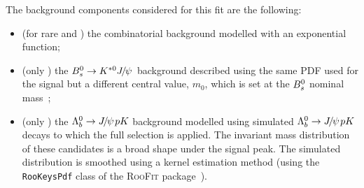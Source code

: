 The background components considered for this fit are the following:
\begin{itemize}
\item (for rare and \jpsi) the combinatorial background modelled with an exponential function;
\item (only \jpsi) the $\Bs\to\Kstarz\jpsi$ background described using the same PDF used for the signal but a different
central value, $m_{0}$, which is set at the ${{B}^0_{s}}$ nominal mass~\cite{PDG2014};
\item (only \jpsi) the $\Lb\to\jpsi pK$ background modelled using simulated \mbox{$\Lb\to\jpsi pK$} decays
to which the full selection is applied. The invariant mass distribution
of these candidates is a broad shape under the signal peak. The simulated distribution 
is smoothed using a kernel estimation method (using the \verb!RooKeysPdf! class of
the \textsc{RooFit} package~\cite{Verkerke:2003ir}).
\end{itemize}
%
